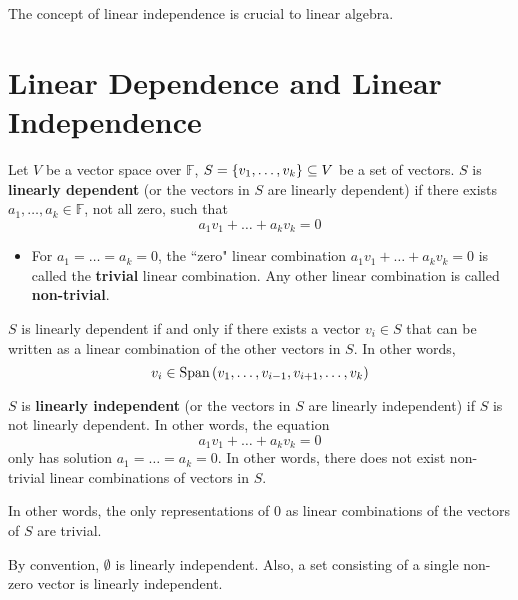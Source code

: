 \documentclass[letterpaper,12pt]{article}
\begin{document}
The concept of linear independence is crucial to linear algebra.

\section*{Linear Dependence and Linear Independence}
\begin{definition}
Let $V$ be a vector space over $\mathbb{F}$, $S = \left\{ v_1, \dots, v_k \right\} \subseteq V$ be a set of vectors. $S$ is \textbf{linearly dependent} (or the vectors in $S$ are linearly dependent) if there exists $a_1, \dots, a_k \in \mathbb{F}$, not all zero, such that
\begin{equation*}
    a_1 v_1 + \dots + a_k v_k = 0
\end{equation*}
\begin{itemize}
    \item For $a_1 = \dots = a_k = 0$, the ``zero" linear combination $a_1 v_1 + \dots + a_k v_k = 0$ is called the \textbf{trivial} linear combination. Any other linear combination is called \textbf{non-trivial}.
\end{itemize}
\end{definition}

\begin{theorem}
$S$ is linearly dependent if and only if there exists a vector $v_i \in S$ that can be written as a linear combination of the other vectors in $S$. In other words,
\begin{equation*}
    v_i \in \text{Span}\left(v_1, \dots, v_{i-1}, v_{i+1}, \dots, v_k \right)
\end{equation*}
\end{theorem}

\begin{definition}
$S$ is \textbf{linearly independent} (or the vectors in $S$ are linearly independent) if $S$ is not linearly dependent. In other words, the equation
\begin{equation*}
    a_1 v_1 + \dots + a_k v_k = 0
\end{equation*}
only has solution $a_1 = \dots = a_k = 0$. In other words, there does not exist non-trivial linear combinations of vectors in $S$.
\end{definition}

In other words, the only representations of $0$ as linear combinations of the vectors of $S$ are trivial.

\begin{example}
By convention, $\emptyset$ is linearly independent. Also, a set consisting of a single non-zero vector is linearly independent.
\end{example}
\end{document}
